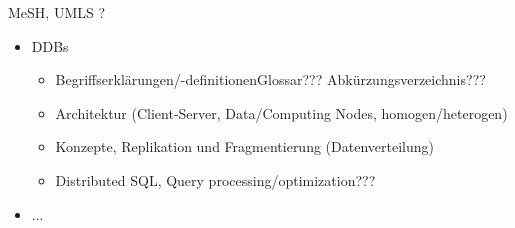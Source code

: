 MeSH, UMLS ?

\begin{itemize}
    \item DDBs
    \begin{itemize}
        \item Begriffserklärungen/-definitionen\textrightarrow Glossar??? Abkürzungsverzeichnis???
        \item Architektur (Client-Server, Data/Computing Nodes, homogen/heterogen)
        \item Konzepte, Replikation und Fragmentierung (Datenverteilung)
        \item Distributed SQL, Query processing/optimization???
    \end{itemize}
    
    \item ...
\end{itemize}




\listoftodos